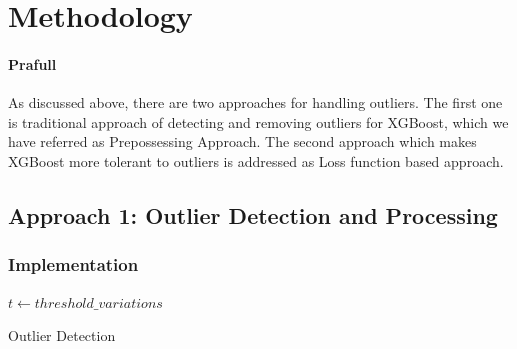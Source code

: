 \documentclass[runningheads]{llncs}
\begin{document}
\section{Methodology}
\paragraph{Prafull} As discussed above, there are two approaches for handling outliers. The first one is traditional approach of detecting and removing outliers for XGBoost, which we have referred as Prepossessing Approach. The second approach which makes XGBoost more tolerant to outliers is addressed as Loss function based approach.
\subsection{Approach 1: Outlier Detection and Processing}
\subsubsection{Implementation}

\begin{algorithm}[H]
\SetAlgoLined

 \STATE $t\gets threshold\_variations$
 
 
 \While{$t\neq empty$}{
  \STATE $outlier\_fraction\gets t.head(1)$
  
  \STATE $classifiers\gets \{ \\
     abod: angle\_based\_outlier\_detection \\
     cblof: cluseter\_based\_outlier\_detection \\
        ... \\
  \}$
  
  \For{$cls\_name, $cls\_object in classifiers$ $}    {
      
       
          
          \STATE $X\_train \gets dataset$ \\
          \STATE $cls\_object.fit(X\_train)$
          
          \STATE  $scores\_pred \gets cls\_object.decision\_function(X\_train)*-1$ \\
          \STATE $y\_pred \gets cls\_object.predict(X\_train)$
          
          \STATE $outliers \gets scores\_pred.head(outlier\_fraction)$
          
          \STATE $dataset\_new \gets X\_train.drop(outliers)$
          
          \STATE $result \gets crossValidate(dataset\_new, parameters)$
          
          \STATE $y\_pred \gets xgboost.predict(dataset\_new)$
   }                
   \EndFor
 }
 \caption{Outlier Detection}
\end{algorithm}
\end{document}
